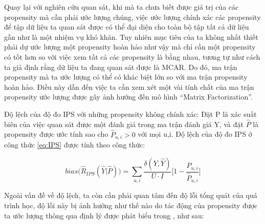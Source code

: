 Quay lại với nghiên cứu quan sát, khi mà ta chưa biết được giá trị của các propensity mà cần phải ước lượng chúng, việc ước lượng chính xác các propensity để tập dữ liệu ta quan sát được có thể đại diện cho toàn bộ tập tất cả dữ liệu gần như là một nhiệm vụ khó khăn. Tuy nhiên mục tiêu của ta không nhất thiết phải dự ước lượng một propensity hoàn hảo như vậy mà chỉ cần một propensity có tốt hơn so với việc xem tất cả các propensity là bằng nhau, tương tự như cách ta giả định rằng dữ liệu ta đang quan sát được là MCAR. Do đó, ma trận propensity mà ta ước lượng có thể có khác biệt lớn so với ma trận propensity hoàn hảo. Điều này dẫn đến việc ta cần xem xét một vài tính chất của ma trận propensity ước lượng được gây ảnh hưởng đến mô hình ``Matrix Factorization''.

\begin{lemma}
Độ lệch của độ đo IPS với những propensity không chính xác: Đặt P là xác suất biên của việc quan sát được một đánh giá trong ma trận đánh giá Y, và đặt $\hat{P}$ là propensity được ước tính sao cho $\hat{P}_{u,i} > 0$ với mọi u,i. Độ lệch của độ đo IPS ở công thức \ref{eq:IPS} được tính theo công thức:

\begin{equation}
\label{eq:biasips}
bias\bigg (\hat{R}_{IPS}(\hat{Y}|\hat{P}) \bigg) = \sum_{u,i} \frac{\delta(Y, \hat{Y})}{U \cdot I} \Bigg[1-\frac{P_{u,i}}{\hat{P}_{u,i}}\Bigg]
\end{equation}
\end{lemma}

Ngoài vấn đề về độ lệch, ta còn cần phải quan tâm đến độ lỗi tổng quát của quá trình học, độ lỗi này bị ảnh hưởng như thế nào do tác động của propensity được ta ước lượng thông qua định lý được phát biểu trong \cite{IPS}, như sau:

